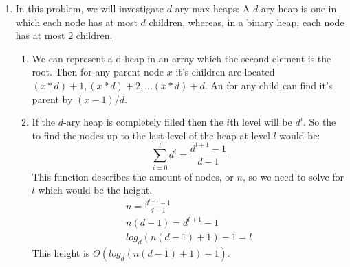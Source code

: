 \documentclass{article}
\begin{document}




\begin{enumerate}

\item In this problem, we will investigate $d$-ary max-heaps: A $d$-ary heap is one in which each node has at most $d$ children, whereas, in a binary heap, each node has at most $2$ children.

\begin{enumerate}
\item 
We can represent a d-heap in an array which the second element is the root. Then for any parent node $x$ it's children are located $(x*d)+1,(x*d)+2,...(x*d)+d$. An for any child can find it's parent by  $(x-1)/d$.

\item 
If the $d$-ary heap is completely filled then the $i$th level will be $d^i$. So the to find the nodes up to the last level of the heap at level $l$ would be: 
\begin{equation}
\sum_{i=0}^{l} d^i = \frac{d^{l+1}-1}{d-1} 
\end{equation}
This function describes the amount of nodes, or $n$, so we need to solve for $l$ which would be the height.
\begin{equation}
 \begin{aligned}
    n = \frac{d^{l+1}-1}{d-1} \\
    n(d-1) = d^{l+1}-1 \\
   log_d (n(d-1)+1)-1 = l           
  \end{aligned} 
\end{equation}
This height is $\Theta(log_d (n(d-1)+1)-1)$.


\end{enumerate}
\end{enumerate}
\end{document}

